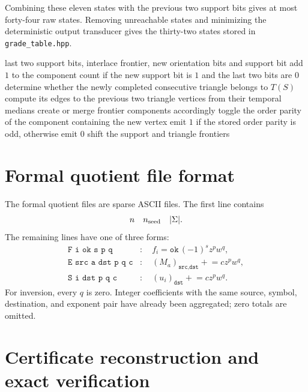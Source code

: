\documentclass[10pt,letterpaper]{article}
\newcommand{\code}[1]{\nolinkurl{#1}}
\begin{document}
Combining these eleven states with the previous two support bits gives at most forty-four raw states.  Removing unreachable states and minimizing the deterministic output transducer gives the thirty-two states stored in \code{grade_table.hpp}.

\begin{algorithm}[t]
\caption{Raw grade-transducer update}\label{alg:grade-update}
\begin{algorithmic}[1]
\Require last two support bits, interlace frontier, new orientation bits and support bit
\State add \(1\) to the component count if the new support bit is \(1\) and the last two bits are \(0\)
\State determine whether the newly completed consecutive triangle belongs to \(T(S)\)
  \State compute its edges to the previous two triangle vertices from their temporal medians
  \State create or merge frontier components accordingly
  \State toggle the order parity of the component containing the new vertex
\EndIf
{}
  \State emit \(1\) if the stored order parity is odd, otherwise emit \(0\)
\EndFor
\State shift the support and triangle frontiers
\end{algorithmic}
\end{algorithm}

\section{Formal quotient file format}\label{app:file-formats}

The formal quotient files are sparse ASCII files.  The first line contains
\[
 n\quad n_{\rm seed}\quad |\Sigma|.
\]
The remaining lines have one of three forms:
\begin{align*}
\texttt{F i ok s p q}
 &:\quad f_i=\texttt{ok}\,(-1)^s z^pw^q,\\
\texttt{E src a dst p q c}
 &:\quad (M_a)_{\texttt{src},\texttt{dst}}\mathrel{+}=c z^pw^q,\\
\texttt{S i dst p q c}
 &:\quad (u_i)_{\texttt{dst}}\mathrel{+}=c z^pw^q.
\end{align*}
For inversion, every \(q\) is zero.  Integer coefficients with the same source, symbol, destination, and exponent pair have already been aggregated; zero totals are omitted.

\section{Certificate reconstruction and exact verification}\label{app:certificate-details}
\end{document}
